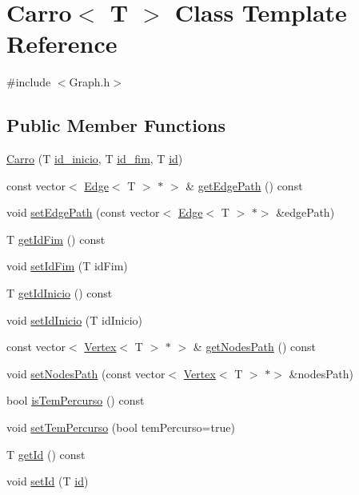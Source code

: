 \hypertarget{class_carro}{}\section{Carro$<$ T $>$ Class Template Reference}
\label{class_carro}


{\ttfamily \#include $<$Graph.\+h$>$}

\subsection*{Public Member Functions}
\begin{DoxyCompactItemize}
\item 
\mbox{\hyperlink{class_carro_ace81433a19d4303c0b2862f04bff8299}{Carro}} (T \mbox{\hyperlink{class_carro_ac1142f0e001f982a7789fe20514f5db7}{id\+\_\+inicio}}, T \mbox{\hyperlink{class_carro_a6d4a8cf39f76caecafa0bffcedc50efc}{id\+\_\+fim}}, T \mbox{\hyperlink{class_carro_ab7edb4871bda624992f83ef2b9d1babf}{id}})
\item 
const vector$<$ \mbox{\hyperlink{class_edge}{Edge}}$<$ T $>$ $\ast$ $>$ \& \mbox{\hyperlink{class_carro_a4d9a743b0a85dfb370f9b359d78f2514}{get\+Edge\+Path}} () const
\item 
void \mbox{\hyperlink{class_carro_a56188f8ca0f9d234afffe7217dd815e2}{set\+Edge\+Path}} (const vector$<$ \mbox{\hyperlink{class_edge}{Edge}}$<$ T $>$ $\ast$$>$ \&edge\+Path)
\item 
T \mbox{\hyperlink{class_carro_aa6284214e8970464875ca6186937addd}{get\+Id\+Fim}} () const
\item 
void \mbox{\hyperlink{class_carro_aabd6aa0f101beb395c1a35f10ad396e5}{set\+Id\+Fim}} (T id\+Fim)
\item 
T \mbox{\hyperlink{class_carro_afc97b5bbf41b203cb80c10ea4628fc0a}{get\+Id\+Inicio}} () const
\item 
void \mbox{\hyperlink{class_carro_a842e35fbf2fc1735b43ceef5edbbf16b}{set\+Id\+Inicio}} (T id\+Inicio)
\item 
const vector$<$ \mbox{\hyperlink{class_vertex}{Vertex}}$<$ T $>$ $\ast$ $>$ \& \mbox{\hyperlink{class_carro_a25901ca0dfa975e9b818b76934ec26ad}{get\+Nodes\+Path}} () const
\item 
void \mbox{\hyperlink{class_carro_a0fad21bc608f882261552c7bd1b08989}{set\+Nodes\+Path}} (const vector$<$ \mbox{\hyperlink{class_vertex}{Vertex}}$<$ T $>$ $\ast$$>$ \&nodes\+Path)
\item 
bool \mbox{\hyperlink{class_carro_ac73955dd65c1a78d3faa267900b44094}{is\+Tem\+Percurso}} () const
\item 
void \mbox{\hyperlink{class_carro_a00026726b81377887e49ff9efcb7dd5d}{set\+Tem\+Percurso}} (bool tem\+Percurso=true)
\item 
T \mbox{\hyperlink{class_carro_ab5aec5bb1cf78174bf9babbfe2b98738}{get\+Id}} () const
\item 
void \mbox{\hyperlink{class_carro_a2318f898be3f5950e19326d740a7073e}{set\+Id}} (T \mbox{\hyperlink{class_carro_ab7edb4871bda624992f83ef2b9d1babf}{id}})
\end{DoxyCompactItemize}
